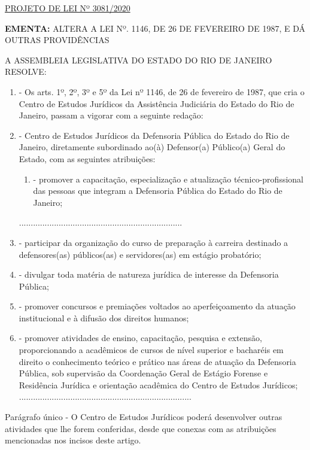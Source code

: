 \documentclass[10pt]{article}
\date{}
\begin{document}
\maketitle
\begin{center}
  \huge
  \vspace{-3cm}\href{http://alerjln1.alerj.rj.gov.br/scpro1923.nsf/f4b46b3cdbba990083256cc900746cf6/eb9d757e8b554e6f032585d1006eac39?OpenDocument}{PROJETO DE LEI Nº 3081/2020}
\bigskip
\bigskip
\bigskip
  
\end{center}

\textbf{EMENTA:} 
ALTERA A LEI Nº. 1146, DE 26 DE FEVEREIRO DE 1987, E DÁ OUTRAS PROVIDÊNCIAS 








\bigskip

\noindent
A ASSEMBLEIA LEGISLATIVA DO ESTADO DO RIO DE JANEIRO RESOLVE:

\begin{enumerate}[label=Art. \arabic*\textdegree]
\item - Os arts. 1º, 2º, 3º e 5º da Lei nº 1146, de 26 de fevereiro de 1987, que cria o Centro de Estudos Jurídicos da Assistência Judiciária do Estado do Rio de Janeiro, passam a vigorar com a seguinte redação:


\item - Centro de Estudos Jurídicos da Defensoria Pública do Estado do Rio de Janeiro, diretamente subordinado ao(à) Defensor(a) Público(a) Geral do Estado, com as seguintes atribuições:
\begin{enumerate}[label=\Roman*]
\item - promover a capacitação, especialização e atualização técnico-profissional das pessoas que integram a Defensoria Pública do Estado do Rio de Janeiro;
\end{enumerate}
......................................................................
\item - participar da organização do curso de preparação à carreira destinado a defensores(as) públicos(as) e servidores(as) em estágio probatório;
\item - divulgar toda matéria de natureza jurídica de interesse da Defensoria Pública;
\item - promover concursos e premiações voltados ao aperfeiçoamento da atuação institucional e à difusão dos direitos humanos;
\item - promover atividades de ensino, capacitação, pesquisa e extensão, proporcionando a acadêmicos de cursos de nível superior e bacharéis em direito o conhecimento teórico e prático nas áreas de atuação da Defensoria Pública, sob supervisão da Coordenação Geral de Estágio Forense e Residência Jurídica e orientação acadêmica do Centro de Estudos Jurídicos;
..........................................................................
\end{enumerate}
Parágrafo único - O Centro de Estudos Jurídicos poderá desenvolver outras atividades que lhe forem conferidas, desde que conexas com as atribuições mencionadas nos incisos deste artigo.
\end{document}
